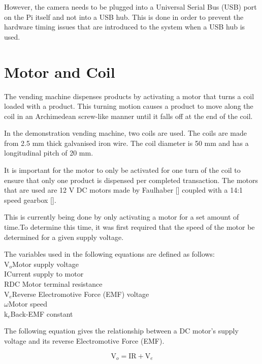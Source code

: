 However, the camera needs to be plugged into a Universal Serial Bus (USB) port
on the Pi itself and not into a USB hub. This is done in order to prevent the
hardware timing issues that are introduced to the system when a USB hub is used. 

\section{Motor and Coil}

The vending machine dispenses products by activating a motor that turns a coil
loaded with a product. This turning motion causes a product to move along the
coil in an Archimedean screw-like manner until it falls off at the end of the
coil. 

In the demonstration vending machine, two coils are used. The coils are made
from 2.5 mm thick galvanised iron wire. The coil diameter is 50 mm and has a
longitudinal pitch of 20 mm. 

It is important for the motor to only be activated for one turn of the coil to
ensure that only one product is dispensed per completed transaction. The motors
that are used are 12 V DC motors made by Faulhaber [\cite{manual:dc-motors}]
coupled with a 14:1 speed gearbox [\cite{manual:gearbox}].

This is currently being done by only activating a motor for a set amount of
time.To determine this time, it was first required that the speed of the motor
be determined for a given supply voltage. 

\begin{minipage}{\textwidth}
The variables used in the following equations are defined as follows:\\

V$_o$\dotfill Motor supply voltage\\
I\dotfill Current supply to motor\\
R\dotfill DC Motor terminal resistance\\
V$_e$\dotfill Reverse Electromotive Force (EMF) voltage\\
$\omega$\dotfill Motor speed\\
k$_e$\dotfill Back-EMF constant\\
\end{minipage}

The following equation gives the relationship between a DC motor's supply
voltage and its reverse Electromotive Force (EMF).

\[ \mathrm{V}_o = \mathrm{IR} + \mathrm{V}_e\]

